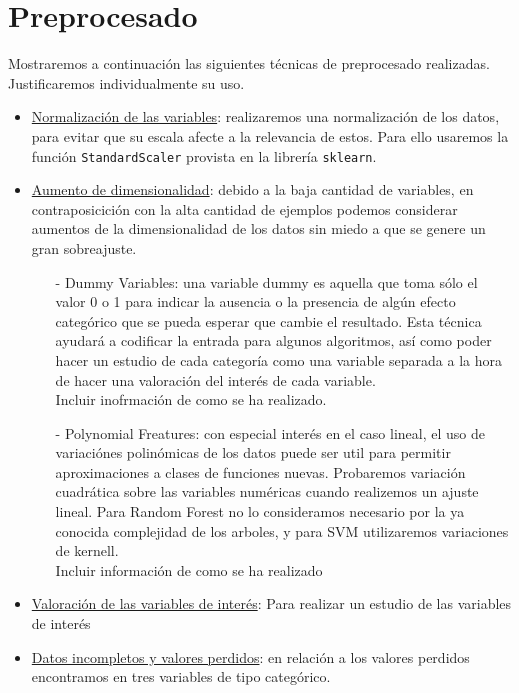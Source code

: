 \documentclass[11pt,a4paper]{article}
\begin{document}
\section{Preprocesado}

Mostraremos a continuación las siguientes técnicas de preprocesado realizadas. Justificaremos individualmente su uso.

\begin{itemize}

	\item \underline{Normalización de las variables}: realizaremos una normalización de los datos, para evitar que su escala afecte a la relevancia de estos. Para ello usaremos la función \texttt{StandardScaler}\cite{standardscaler} provista en la librería \texttt{sklearn}.
	\item \underline{Aumento de dimensionalidad}: debido a la baja cantidad de variables, en contraposicición con la alta cantidad de ejemplos podemos considerar aumentos de la dimensionalidad de los datos sin miedo a que se genere un gran sobreajuste.
	\begin{itemize}
	\item[-] Dummy Variables: una variable dummy es aquella que toma sólo el valor 0 o 1 para indicar la ausencia o la presencia de algún efecto categórico que se pueda esperar que cambie el resultado. Esta técnica ayudará a codificar la entrada para algunos algoritmos, así como poder hacer un estudio de cada categoría como una variable separada a la hora de hacer una valoración del interés de cada variable.\\
	
	Incluir inofrmación de como se ha realizado.
	 
	\item[-] Polynomial Freatures: con especial interés en el caso lineal, el uso de variaciónes polinómicas de los datos puede ser util para permitir aproximaciones a clases de funciones nuevas. Probaremos variación cuadrática sobre las variables numéricas cuando realizemos un ajuste lineal. Para Random Forest no lo consideramos necesario por la ya conocida complejidad de los arboles, y para SVM utilizaremos variaciones de kernell. \\
	
	Incluir información de como se ha realizado
\end{itemize}
	\item \underline{Valoración de las variables de interés}: Para realizar un estudio de las variables de interés 
	\item \underline{Datos incompletos y valores perdidos}: en relación a los valores perdidos encontramos en tres variables de tipo categórico.\\
	

\end{itemize}
\end{document}
